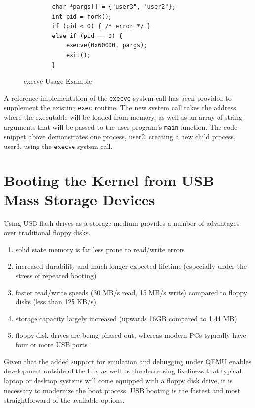 \documentclass[titlepage]{article}
\begin{document}
\begin{figure}[!ht]
\begin{verbatim}
        char *pargs[] = {"user3", "user2"};
        int pid = fork();
        if (pid < 0) { /* error */ }
        else if (pid == 0) {
            execve(0x60000, pargs);
            exit();
        }
\end{verbatim}
\caption{execve Usage Example}
\end{figure}

A reference implementation of the \verb!execve! system call has been provided
to supplement the existing \verb!exec! routine. The new system call
takes the address where the executable will be loaded from memory, as well as
an array of string arguments that will be passed to the user program's
\verb!main! function. The code snippet above demonstrates one process, user2,
creating a new child process, user3, using the \verb!execve! system call.

\section{Booting the Kernel from USB Mass Storage Devices}

Using USB flash drives as a storage medium provides a number of advantages over
traditional floppy disks.

\begin{enumerate}
    \item solid state memory is far less prone to read/write errors
    \item increased durability and much longer expected lifetime (especially
    under the stress of repeated booting)
    \item faster read/write speeds (30 MB/s read, 15 MB/s write) compared to
    floppy disks (less than 125 KB/s)
    \item storage capacity largely increased (upwards 16GB compared to 1.44 MB)
    \item floppy disk drives are being phased out, whereas modern PCs typically
    have four or more USB ports
\end{enumerate}

Given that the added support for emulation and debugging under QEMU enables
development outside of the lab, as well as the decreasing likeliness that
typical laptop or desktop systems will come equipped with a floppy disk drive,
it is necessary to modernize the boot process. USB booting is the fastest and
most straightforward of the available options.
\end{document}
